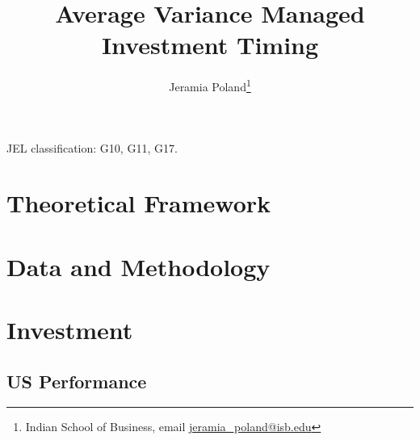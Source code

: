 \documentclass[11pt]{article}
\begin{document}
\onehalfspacing      %

\author{Jeramia Poland\thanks{\rm Indian School of Business, email \href{mailto:jeramia_poland@isb.edu}{jeramia\_poland@isb.edu} \newline
		\protect } }

\title{\Large \bf Average Variance Managed Investment Timing}

\date{}              %


\maketitle
\thispagestyle{empty}

\bigskip



\medskip

\noindent JEL classification: G10, G11, G17.

\clearpage



\section{Theoretical Framework} \label{sec:theory}



\section{Data and Methodology} \label{sec:Data}



\section{Investment} \label{sec:asset_allocation}



\subsection{US Performance} \label{sec:port_performance}
\end{document}

